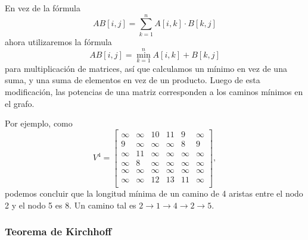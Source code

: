 En vez de la fórmula
\[
    AB[i,j] = \sum_{k=1}^n A[i,k] \cdot B[k,j]
\]
ahora utilizaremos la fórmula
\[
    AB[i,j] = \min_{k=1}^n A[i,k] + B[k,j]
\]
para multiplicación de matrices, así que calculamos un mínimo en vez de una
suma, y una suma de elementos en vez de un producto. Luego de esta
modificación, las potencias de una matriz corresponden a los caminos mínimos
en el grafo.

Por ejemplo, como
\[
    V^4= \begin{bmatrix}
        \infty & \infty & 10     & 11     & 9      & \infty \\
        9      & \infty & \infty & \infty & 8      & 9      \\
        \infty & 11     & \infty & \infty & \infty & \infty \\
        \infty & 8      & \infty & \infty & \infty & \infty \\
        \infty & \infty & \infty & \infty & \infty & \infty \\
        \infty & \infty & 12     & 13     & 11     & \infty \\
    \end{bmatrix},
\]
podemos concluir que la longitud mínima de un camino de 4 aristas entre
el nodo 2 y el nodo 5 es 8. Un camino tal es
$2 \rightarrow 1 \rightarrow 4 \rightarrow 2 \rightarrow 5$.

\pagebreak
\subsubsection{Teorema de Kirchhoff}


